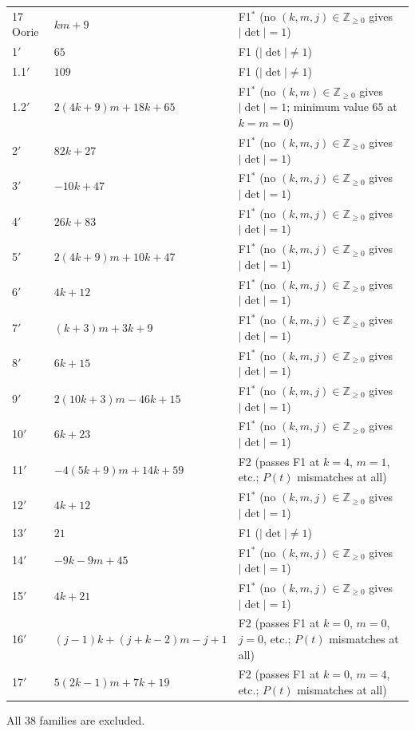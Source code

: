 \begin{longtable}{@{}l l >{\raggedright\arraybackslash}p{}@{}}
17 Oorie & $km+9$ & F1$^{*}$ (no $(k,m,j) \in \mathbb{Z}_{\ge 0}$ gives $|\det|=1$) \\
1$'$ & $65$ & F1 ($|\det| \neq 1$) \\
1.1$'$ & $109$ & F1 ($|\det| \neq 1$) \\
1.2$'$ & $2(4k+9)m+18k+65$ & F1$^{*}$ (no $(k,m) \in \mathbb{Z}_{\ge 0}$ gives $|\det|=1$; minimum value $65$ at $k=m=0$) \\
2$'$ & $82k+27$ & F1$^{*}$ (no $(k,m,j) \in \mathbb{Z}_{\ge 0}$ gives $|\det|=1$) \\
3$'$ & $-10k+47$ & F1$^{*}$ (no $(k,m,j) \in \mathbb{Z}_{\ge 0}$ gives $|\det|=1$) \\
4$'$ & $26k+83$ & F1$^{*}$ (no $(k,m,j) \in \mathbb{Z}_{\ge 0}$ gives $|\det|=1$) \\
5$'$ & $2(4k+9)m+10k+47$ & F1$^{*}$ (no $(k,m,j) \in \mathbb{Z}_{\ge 0}$ gives $|\det|=1$) \\
6$'$ & $4k+12$ & F1$^{*}$ (no $(k,m,j) \in \mathbb{Z}_{\ge 0}$ gives $|\det|=1$) \\
7$'$ & $(k+3)m+3k+9$ & F1$^{*}$ (no $(k,m,j) \in \mathbb{Z}_{\ge 0}$ gives $|\det|=1$) \\
8$'$ & $6k+15$ & F1$^{*}$ (no $(k,m,j) \in \mathbb{Z}_{\ge 0}$ gives $|\det|=1$) \\
9$'$ & $2(10k+3)m-46k+15$ & F1$^{*}$ (no $(k,m,j) \in \mathbb{Z}_{\ge 0}$ gives $|\det|=1$) \\
10$'$ & $6k+23$ & F1$^{*}$ (no $(k,m,j) \in \mathbb{Z}_{\ge 0}$ gives $|\det|=1$) \\
11$'$ & $-4(5k+9)m+14k+59$ & F2 (passes F1 at $k = 4$, $m = 1$, etc.; $P(t)$ mismatches at all) \\
12$'$ & $4k+12$ & F1$^{*}$ (no $(k,m,j) \in \mathbb{Z}_{\ge 0}$ gives $|\det|=1$) \\
13$'$ & $21$ & F1 ($|\det| \neq 1$) \\
14$'$ & $-9k-9m+45$ & F1$^{*}$ (no $(k,m,j) \in \mathbb{Z}_{\ge 0}$ gives $|\det|=1$) \\
15$'$ & $4k+21$ & F1$^{*}$ (no $(k,m,j) \in \mathbb{Z}_{\ge 0}$ gives $|\det|=1$) \\
16$'$ & $(j-1)k+(j+k-2)m-j+1$ & F2 (passes F1 at $k = 0$, $m = 0$, $j = 0$, etc.; $P(t)$ mismatches at all) \\
17$'$ & $5(2k-1)m+7k+19$ & F2 (passes F1 at $k = 0$, $m = 4$, etc.; $P(t)$ mismatches at all) \\
\bottomrule
\end{longtable}

All $38$ families are excluded.

